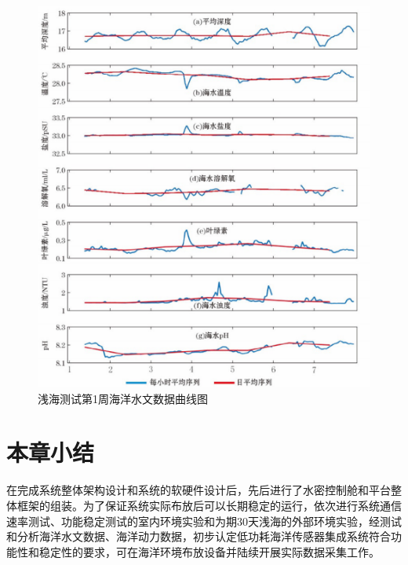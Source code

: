 \begin{figure}[ht]
    \centering
	\includegraphics[width=1\textwidth]{fig/浅海测试第1周海洋水文数据曲线图.png}
	\caption{浅海测试第1周海洋水文数据曲线图}
	\label{fig:测试数据}
\end{figure}

\section{本章小结}
在完成系统整体架构设计和系统的软硬件设计后，先后进行了水密控制舱和平台整体框架的组装。为了保证系统实际布放后可以长期稳定的运行，依次进行系统通信速率测试、功能稳定测试的室内环境实验和为期30天浅海的外部环境实验，经测试和分析海洋水文数据、海洋动力数据，初步认定低功耗海洋传感器集成系统符合功能性和稳定性的要求，可在海洋环境布放设备并陆续开展实际数据采集工作。